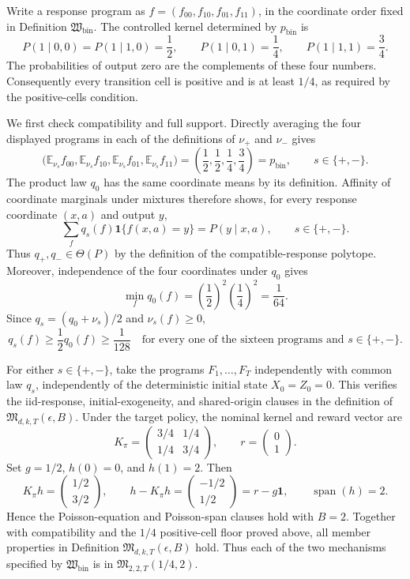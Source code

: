 Write a response program as \(f=(f_{00},f_{10},f_{01},f_{11})\), in the coordinate order fixed in Definition \(\mathfrak W_{\mathrm{bin}}\).  The controlled kernel determined by \(p_{\mathrm{bin}}\) is
\[
 P(1\mid 0,0)=P(1\mid 1,0)=\frac12,
 \qquad
 P(1\mid 0,1)=\frac14,
 \qquad
 P(1\mid 1,1)=\frac34 .
\]
The probabilities of output zero are the complements of these four numbers.  Consequently every transition cell is positive and is at least \(1/4\), as required by the positive-cells condition.

We first check compatibility and full support.  Directly averaging the four displayed programs in each of the definitions of \(\nu_+\) and \(\nu_-\) gives
\[
 \bigl(\mathbb E_{\nu_s}f_{00},\mathbb E_{\nu_s}f_{10},
        \mathbb E_{\nu_s}f_{01},\mathbb E_{\nu_s}f_{11}\bigr)
 =\left(\frac12,\frac12,\frac14,\frac34\right)=p_{\mathrm{bin}},
 \qquad s\in\{+,-\}.
\]
The product law \(q_0\) has the same coordinate means by its definition.  Affinity of coordinate marginals under mixtures therefore shows, for every response coordinate \((x,a)\) and output \(y\),
\[
 \sum_f q_s(f)\mathbf 1\{f(x,a)=y\}=P(y\mid x,a),
 \qquad s\in\{+,-\}.
\]
Thus \(q_+,q_-\in\Theta(P)\) by the definition of the compatible-response polytope.  Moreover, independence of the four coordinates under \(q_0\) gives
\[
 \min_f q_0(f)
 =\left(\frac12\right)^2\left(\frac14\right)^2
 =\frac1{64}.
\]
Since \(q_s=(q_0+\nu_s)/2\) and \(\nu_s(f)\ge 0\),
\[
 q_s(f)\ge\frac12q_0(f)\ge\frac1{128}
 \quad\text{for every one of the sixteen programs and }s\in\{+,-\}.
\]

For either \(s\in\{+,-\}\), take the programs \(F_1,\ldots,F_T\) independently with common law \(q_s\), independently of the deterministic initial state \(X_0=Z_0=0\).  This verifies the iid-response, initial-exogeneity, and shared-origin clauses in the definition of \(\mathfrak M_{d,k,T}(\epsilon,B)\).  Under the target policy, the nominal kernel and reward vector are
\[
 K_\pi=\begin{pmatrix}3/4&1/4\\[2pt]1/4&3/4\end{pmatrix},
 \qquad r=\begin{pmatrix}0\\1\end{pmatrix}.
\]
Set \(g=1/2\), \(h(0)=0\), and \(h(1)=2\).  Then
\[
 K_\pi h=\begin{pmatrix}1/2\\3/2\end{pmatrix},
 \qquad
 h-K_\pi h=\begin{pmatrix}-1/2\\1/2\end{pmatrix}
 =r-g\mathbf 1,
 \qquad
 \operatorname{span}(h)=2.
\]
Hence the Poisson-equation and Poisson-span clauses hold with \(B=2\).  Together with compatibility and the \(1/4\) positive-cell floor proved above, all member properties in Definition \(\mathfrak M_{d,k,T}(\epsilon,B)\) hold.  Thus each of the two mechanisms specified by \(\mathfrak W_{\mathrm{bin}}\) is in \(\mathfrak M_{2,2,T}(1/4,2)\).

